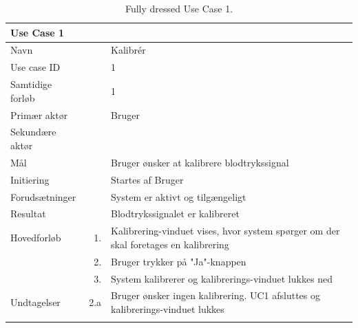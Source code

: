 \begin{longtabu} to  %
    {\large \textbf{Use Case 1}} && \\
    \toprule
    Navn &&    Kalibrér\\
    Use case ID &&    1\\
    Samtidige forløb &&    1\\
    Primær aktør &&    Bruger\\
    Sekundære aktør &&	 \\
    Mål &&    Bruger ønsker at kalibrere blodtrykssignal\\
    Initiering &&	Startes af Bruger\\
    Forudsætninger &&  System er aktivt og tilgængeligt\\
    Resultat &&		Blodtrykssignalet er kalibreret                         \\ \midrule
    Hovedforløb &    1. &	 Kalibrering-vinduet vises, hvor system spørger om der skal foretages en kalibrering\\[-1ex]  				
    			&    2. &    Bruger trykker på "Ja"\--knappen\\
                &    3.	&	 System kalibrerer og kalibrerings-vinduet lukkes ned \newline\\ \midrule
                
    Undtagelser &    2.a &   Bruger ønsker ingen kalibrering. UC1 afsluttes og kalibrerings-vinduet lukkes  \\ \bottomrule
\caption{Fully dressed Use Case 1.}
\label{UC1}
\end{longtabu}


